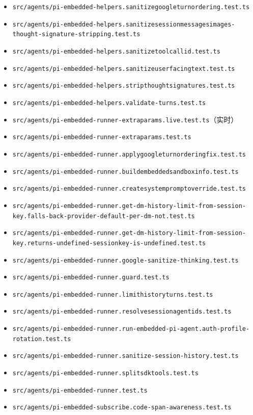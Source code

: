 \begin{itemize}
  \item \texttt{src/agents/pi-embedded-helpers.sanitizegoogleturnordering.test.ts}
  \item \texttt{src/agents/pi-embedded-helpers.sanitizesessionmessagesimages-thought-signature-stripping.test.ts}
  \item \texttt{src/agents/pi-embedded-helpers.sanitizetoolcallid.test.ts}
  \item \texttt{src/agents/pi-embedded-helpers.sanitizeuserfacingtext.test.ts}
  \item \texttt{src/agents/pi-embedded-helpers.stripthoughtsignatures.test.ts}
  \item \texttt{src/agents/pi-embedded-helpers.validate-turns.test.ts}
  \item \texttt{src/agents/pi-embedded-runner-extraparams.live.test.ts}（实时）
  \item \texttt{src/agents/pi-embedded-runner-extraparams.test.ts}
  \item \texttt{src/agents/pi-embedded-runner.applygoogleturnorderingfix.test.ts}
  \item \texttt{src/agents/pi-embedded-runner.buildembeddedsandboxinfo.test.ts}
  \item \texttt{src/agents/pi-embedded-runner.createsystempromptoverride.test.ts}
  \item \texttt{src/agents/pi-embedded-runner.get-dm-history-limit-from-session-key.falls-back-provider-default-per-dm-not.test.ts}
  \item \texttt{src/agents/pi-embedded-runner.get-dm-history-limit-from-session-key.returns-undefined-sessionkey-is-undefined.test.ts}
  \item \texttt{src/agents/pi-embedded-runner.google-sanitize-thinking.test.ts}
  \item \texttt{src/agents/pi-embedded-runner.guard.test.ts}
  \item \texttt{src/agents/pi-embedded-runner.limithistoryturns.test.ts}
  \item \texttt{src/agents/pi-embedded-runner.resolvesessionagentids.test.ts}
  \item \texttt{src/agents/pi-embedded-runner.run-embedded-pi-agent.auth-profile-rotation.test.ts}
  \item \texttt{src/agents/pi-embedded-runner.sanitize-session-history.test.ts}
  \item \texttt{src/agents/pi-embedded-runner.splitsdktools.test.ts}
  \item \texttt{src/agents/pi-embedded-runner.test.ts}
  \item \texttt{src/agents/pi-embedded-subscribe.code-span-awareness.test.ts}

\end{itemize}
